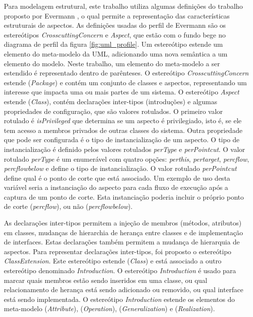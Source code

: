 Para modelagem estrutural, este trabalho utiliza algumas definições do trabalho proposto por Evermann \cite{Evermann:2007:MSP:1229375.1229379}, o qual
permite a representação das características estruturais de aspectos. As definições usadas do perfil de Evermann são os 
estereótipos \textit{CrosscuttingConcern} e \textit{Aspect}, que estão com o fundo bege no diagrama de perfil da figura
\ref{fig:uml_profile}. Um estereótipo estende um elemento do meta-modelo da UML, adicionando uma nova semântica a um elemento do modelo. Neste
trabalho, um elemento do meta-modelo a ser estendido é representado dentro de parênteses. O estereótipo \textit{CrosscuttingConcern} estende
(\textit{Package}) e contém um conjunto de classes e aspectos, representando um interesse que impacta uma ou mais partes de um sistema. O estereótipo
\textit{Aspect} estende (\textit{Class}), contém declarações inter-tipos (introduções) e algumas propriedades de configuração, que são valores
rotulados. O primeiro valor rotulado é \textit{isPrivileged} que determina se um aspecto é privilegiado, isto é, se ele tem acesso a membros privados
de outras classes do sistema. Outra propriedade que pode ser configurada é o tipo de instancialização de um aspecto. O tipo de instancialização é
definido pelos valores rotulados \textit{perType} e \textit{perPointcut}. O valor rotulado \textit{perType} é um enumerável com quatro opções:
\textit{perthis}, \textit{pertarget}, \textit{percflow}, \textit{percflowbelow} e define o tipo de instancialização. O valor
rotulado \textit{perPointcut} define qual é o ponto de corte que está associado. Um exemplo de uso desta variável seria a instanciação do aspecto para
cada fluxo de execução após a captura de um ponto de corte. Esta instanciação poderia incluir o próprio ponto de corte (\textit{percflow}), ou não (\textit{percflowbelow}). 

As declarações inter-tipos permitem a injeção de membros (métodos, atributos) em classes, mudanças de hierarchia de herança entre classes e de
implementação de interfaces. Estas declarações também permitem a mudança de hierarquia de aspectos. Para representar declarações inter-tipos, foi
proposto o estereótipo \textit{ClassExtension}. Este estereótipo estende (\textit{Class}) e está associado a outro estereótipo denominado
\textit{Introduction}. O estereótipo \textit{Introduction} é usado para marcar quais membros estão sendo inseridos em uma classe, ou qual relacionamento de herança está sendo adicionado ou removido, ou qual interface está sendo implementada. O estereótipo
\textit{Introduction} estende os elementos do meta-modelo (\textit{Attribute}), (\textit{Operation}), (\textit{Generalization}) e
(\textit{Realization}).

